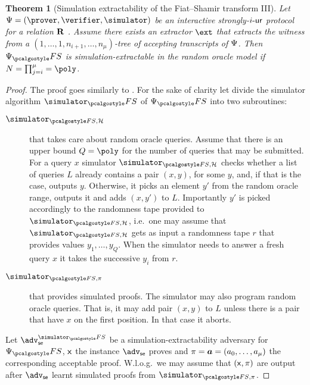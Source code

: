 \documentclass[runningheads,11pt]{llncs}
\let\spvec\vec
\let\vec\accentvec
\let\vec\spvec
\def\vec#1{\mathchoice{\mbox{\boldmath$\displaystyle#1$}}
	{\mbox{\boldmath$\textstyle#1$}}
	{\mbox{\boldmath$\scriptstyle#1$}}
	{\mbox{\boldmath$\scriptscriptstyle#1$}}}
\newtheorem{theorem}{Theorem}%
\theoremstyle{definition}
\begin{document}
\begin{theorem}[Simulation extractability of the Fiat--Shamir transform III]
	\label{thm:wit_ext_em_FS_III}
	Let $\proofsystem = (\prover, \verifier, \simulator)$ be an interactive strongly-${i\text{-}\mathsf{ur}}$ protocol for a relation $\mathbf{R}$
	.
	Assume there exists an extractor $\ext$ that extracts the witness from a $(1, \ldots, 1, n_{i + 1}, \ldots, n_\mu)$-tree of accepting transcripts of $\mathrm{\Psi}$.
	Then $\proofsystem_\fs$ is simulation-extractable in the random oracle model if $N =\prod_{j = i}^\mu = \poly$.
\end{theorem}
\begin{proof}
	The proof goes similarly to \cite[Theorem 3]{INDOCRYPT:FKMV12}. For the sake of clarity let divide the simulator algorithm $\simulator_\fs$ of $\proofsystem_\fs$  into two subroutines:
	\begin{description}
		\item[$\simulator_{\fs, \ro}$] that takes care about random oracle queries. Assume that there is an upper bound $Q = \poly$ for the number of queries that may be submitted.
		For a query $x$ simulator $\simulator_{\fs, \ro}$ checks whether a list of queries $L$ already contains a pair $(x, y)$, for some $y$, and, if that is the case, outputs $y$.
		Otherwise, it picks an element $y'$ from the random oracle range, outputs it and adds $(x, y')$ to $L$. Importantly $y'$ is picked accordingly to the randomness tape provided to $\simulator_{\fs, \ro}$, i.e.~one may assume that $\simulator_{\fs, \ro}$ gets as input a randomness tape $r$ that provides values $y_1, \ldots, y_Q$.
		When the simulator needs to answer a fresh query $x$ it takes the successive $y_i$ from $r$.
		\item[$\simulator_{\fs, \zkproof}$] that provides simulated proofs. The simulator may also program random oracle queries. That is, it may add pair $(x, y)$ to $L$ unless there is a pair that have $x$ on the first position. In that case it aborts.
	\end{description}

	Let $\adv_\se^{\simulator_\fs}$ be a simulation-extractability adversary for $\proofsystem_\fs$, $\mathsf{x}$ the instance $\adv_\se$ proves and $\zkproof = \vec{a} = (a_0, \ldots, a_\mu)$ the corresponding acceptable proof.
	W.l.o.g.~we may assume that $(\mathsf{x}, \pi)$ are output after $\adv_\se$ learnt simulated proofs from $\simulator_{\fs, \zkproof}$.


\end{proof}
\end{document}
